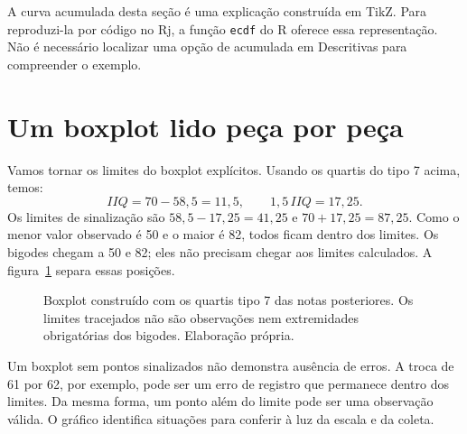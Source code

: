 A curva acumulada desta seção é uma explicação construída em TikZ. Para reproduzi-la por código no Rj, a função \texttt{ecdf} do R oferece essa representação. Não é necessário localizar uma opção de acumulada em Descritivas para compreender o exemplo.

\section{Um boxplot lido peça por peça}

Vamos tornar os limites do boxplot explícitos. Usando os quartis do tipo 7 acima, temos:
\[
 IIQ=70-58{,}5=11{,}5,\qquad 1{,}5\,IIQ=17{,}25.
\]
Os limites de sinalização são $58{,}5-17{,}25=41{,}25$ e $70+17{,}25=87{,}25$. Como o menor valor observado é 50 e o maior é 82, todos ficam dentro dos limites. Os bigodes chegam a 50 e 82; eles não precisam chegar aos limites calculados. A figura~\ref{fig:boxplot-anatomia} separa essas posições.

\begin{figure}[H]
\centering
{}
\caption{Boxplot construído com os quartis tipo 7 das notas posteriores. Os limites tracejados não são observações nem extremidades obrigatórias dos bigodes. Elaboração própria.}
\label{fig:boxplot-anatomia}
\end{figure}

Um boxplot sem pontos sinalizados não demonstra ausência de erros. A troca de 61 por 62, por exemplo, pode ser um erro de registro que permanece dentro dos limites. Da mesma forma, um ponto além do limite pode ser uma observação válida. O gráfico identifica situações para conferir à luz da escala e da coleta.

